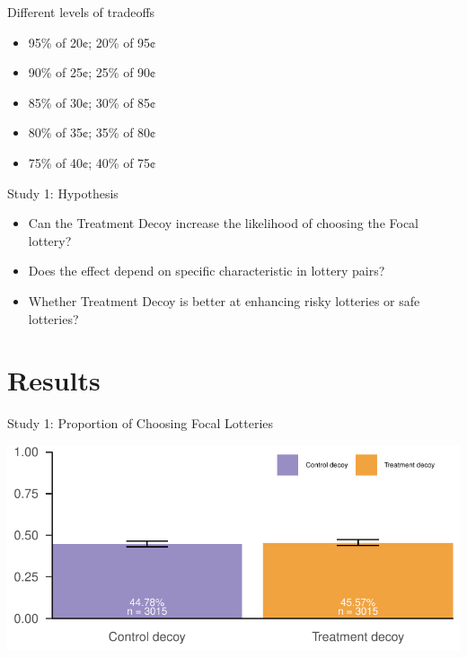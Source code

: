 \documentclass[
  ignorenonframetext,
  aspectratio=169]{beamer}
\begin{document}
\begin{frame}{Different levels of tradeoffs}
\label{different-levels-of-tradeoffs}
\begin{itemize}
  \item 95\% of 20¢; 20\% of 95¢
  \item 90\% of 25¢; 25\% of 90¢
  \item 85\% of 30¢; 30\% of 85¢
  \item 80\% of 35¢; 35\% of 80¢
  \item 75\% of 40¢; 40\% of 75¢
\end{itemize}
\end{frame}

\begin{frame}{Study 1: Hypothesis}
\label{study-1-hypothesis}
\begin{itemize}
  \item Can the Treatment Decoy increase the likelihood of choosing the Focal lottery?
  \pause
  \item Does the effect depend on specific characteristic in lottery pairs?
  \pause
  \item Whether Treatment Decoy is better at enhancing risky lotteries or safe lotteries?
\end{itemize}
\end{frame}

\section{Results}\label{results}

\begin{frame}{Study 1: Proportion of Choosing Focal Lotteries}
\label{study-1-proportion-of-choosing-focal-lotteries}
\begin{flushright}\includegraphics{BDR_Lab_0929_files/figure-beamer/unnamed-chunk-1-1} \end{flushright}
\end{frame}
\end{document}
